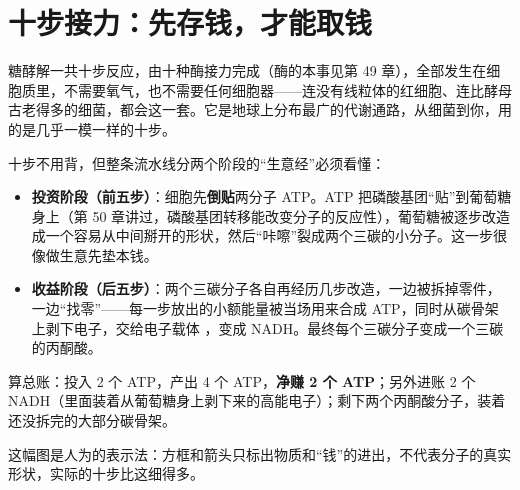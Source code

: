\section{十步接力：先存钱，才能取钱}

糖酵解一共十步反应，由十种酶接力完成（酶的本事见第 49 章），全部发生在细胞质里，不需要氧气，也不需要任何细胞器——连没有线粒体的红细胞、连比酵母古老得多的细菌，都会这一套。它是地球上分布最广的代谢通路，从细菌到你，用的是几乎一模一样的十步。

十步不用背，但整条流水线分两个阶段的“生意经”必须看懂：

\begin{itemize}[itemsep=2pt]
\item \textbf{投资阶段（前五步）}：细胞先\textbf{倒贴}两分子 ATP。ATP 把磷酸基团“贴”到葡萄糖身上（第 50 章讲过，磷酸基团转移能改变分子的反应性），葡萄糖被逐步改造成一个容易从中间掰开的形状，然后“咔嚓”裂成两个三碳的小分子。这一步很像做生意先垫本钱。
\item \textbf{收益阶段（后五步）}：两个三碳分子各自再经历几步改造，一边被拆掉零件，一边“找零”——每一步放出的小额能量被当场用来合成 ATP，同时从碳骨架上剥下电子，交给电子载体 ，变成 NADH。最终每个三碳分子变成一个三碳的丙酮酸。
\end{itemize}

算总账：投入 2 个 ATP，产出 4 个 ATP，\textbf{净赚 2 个 ATP}；另外进账 2 个 NADH（里面装着从葡萄糖身上剥下来的高能电子）；剩下两个丙酮酸分子，装着还没拆完的大部分碳骨架。

\begin{center}
\end{center}

这幅图是人为的表示法：方框和箭头只标出物质和“钱”的进出，不代表分子的真实形状，实际的十步比这细得多。

